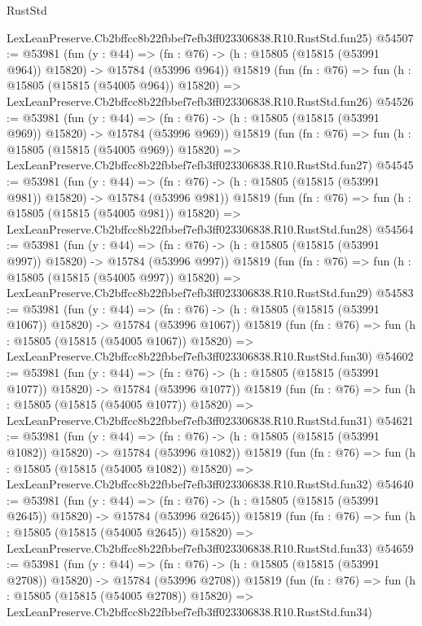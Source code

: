 \begin{lexlean}{RustStd}
\begin{coremodule}
    LexLeanPreserve.Cb2bffcc8b22fbbef7efb3ff023306838.R10.RustStd.fun25)
@54507 := @53981
    (fun (y : @44) =>
    (fn : @76) -> (h : @15805 (@15815 (@53991 @964)) @15820) -> @15784 (@53996 @964))
    @15819
    (fun (fn : @76) =>
    fun (h : @15805 (@15815 (@54005 @964)) @15820) =>
    LexLeanPreserve.Cb2bffcc8b22fbbef7efb3ff023306838.R10.RustStd.fun26)
@54526 := @53981
    (fun (y : @44) =>
    (fn : @76) -> (h : @15805 (@15815 (@53991 @969)) @15820) -> @15784 (@53996 @969))
    @15819
    (fun (fn : @76) =>
    fun (h : @15805 (@15815 (@54005 @969)) @15820) =>
    LexLeanPreserve.Cb2bffcc8b22fbbef7efb3ff023306838.R10.RustStd.fun27)
@54545 := @53981
    (fun (y : @44) =>
    (fn : @76) -> (h : @15805 (@15815 (@53991 @981)) @15820) -> @15784 (@53996 @981))
    @15819
    (fun (fn : @76) =>
    fun (h : @15805 (@15815 (@54005 @981)) @15820) =>
    LexLeanPreserve.Cb2bffcc8b22fbbef7efb3ff023306838.R10.RustStd.fun28)
@54564 := @53981
    (fun (y : @44) =>
    (fn : @76) -> (h : @15805 (@15815 (@53991 @997)) @15820) -> @15784 (@53996 @997))
    @15819
    (fun (fn : @76) =>
    fun (h : @15805 (@15815 (@54005 @997)) @15820) =>
    LexLeanPreserve.Cb2bffcc8b22fbbef7efb3ff023306838.R10.RustStd.fun29)
@54583 := @53981
    (fun (y : @44) =>
    (fn : @76) -> (h : @15805 (@15815 (@53991 @1067)) @15820) -> @15784 (@53996 @1067))
    @15819
    (fun (fn : @76) =>
    fun (h : @15805 (@15815 (@54005 @1067)) @15820) =>
    LexLeanPreserve.Cb2bffcc8b22fbbef7efb3ff023306838.R10.RustStd.fun30)
@54602 := @53981
    (fun (y : @44) =>
    (fn : @76) -> (h : @15805 (@15815 (@53991 @1077)) @15820) -> @15784 (@53996 @1077))
    @15819
    (fun (fn : @76) =>
    fun (h : @15805 (@15815 (@54005 @1077)) @15820) =>
    LexLeanPreserve.Cb2bffcc8b22fbbef7efb3ff023306838.R10.RustStd.fun31)
@54621 := @53981
    (fun (y : @44) =>
    (fn : @76) -> (h : @15805 (@15815 (@53991 @1082)) @15820) -> @15784 (@53996 @1082))
    @15819
    (fun (fn : @76) =>
    fun (h : @15805 (@15815 (@54005 @1082)) @15820) =>
    LexLeanPreserve.Cb2bffcc8b22fbbef7efb3ff023306838.R10.RustStd.fun32)
@54640 := @53981
    (fun (y : @44) =>
    (fn : @76) -> (h : @15805 (@15815 (@53991 @2645)) @15820) -> @15784 (@53996 @2645))
    @15819
    (fun (fn : @76) =>
    fun (h : @15805 (@15815 (@54005 @2645)) @15820) =>
    LexLeanPreserve.Cb2bffcc8b22fbbef7efb3ff023306838.R10.RustStd.fun33)
@54659 := @53981
    (fun (y : @44) =>
    (fn : @76) -> (h : @15805 (@15815 (@53991 @2708)) @15820) -> @15784 (@53996 @2708))
    @15819
    (fun (fn : @76) =>
    fun (h : @15805 (@15815 (@54005 @2708)) @15820) =>
    LexLeanPreserve.Cb2bffcc8b22fbbef7efb3ff023306838.R10.RustStd.fun34)

\end{coremodule}
\end{lexlean}
